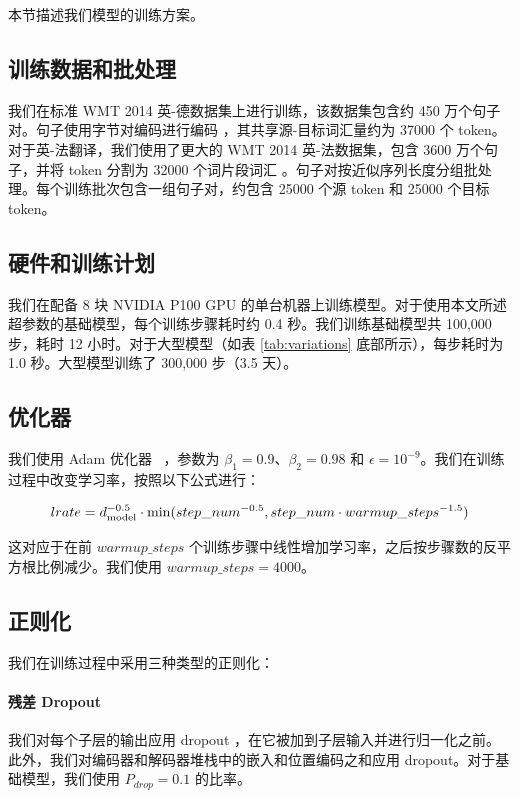 本节描述我们模型的训练方案。 


\subsection{训练数据和批处理}
我们在标准 WMT 2014 英-德数据集上进行训练，该数据集包含约 450 万个句子对。句子使用字节对编码进行编码 \citep{DBLP:journals/corr/BritzGLL17}，其共享源-目标词汇量约为 37000 个 token。对于英-法翻译，我们使用了更大的 WMT 2014 英-法数据集，包含 3600 万个句子，并将 token 分割为 32000 个词片段词汇 \citep{wu2016google}。句子对按近似序列长度分组批处理。每个训练批次包含一组句子对，约包含 25000 个源 token 和 25000 个目标 token。  

\subsection{硬件和训练计划}

我们在配备 8 块 NVIDIA P100 GPU 的单台机器上训练模型。对于使用本文所述超参数的基础模型，每个训练步骤耗时约 0.4 秒。我们训练基础模型共 100,000 步，耗时 12 小时。对于大型模型（如表 \ref{tab:variations} 底部所示），每步耗时为 1.0 秒。大型模型训练了 300,000 步（3.5 天）。

\subsection{优化器} 我们使用 Adam 优化器 ~\citep{kingma2014adam}，参数为 $\beta_1=0.9$、$\beta_2=0.98$ 和 $\epsilon=10^{-9}$。我们在训练过程中改变学习率，按照以下公式进行：

\begin{equation}
lrate = d_{\text{model}}^{-0.5} \cdot
  \min({step\_num}^{-0.5},
    {step\_num} \cdot {warmup\_steps}^{-1.5})
\end{equation}

这对应于在前 $warmup\_steps$ 个训练步骤中线性增加学习率，之后按步骤数的反平方根比例减少。我们使用 $warmup\_steps=4000$。

\subsection{正则化} \label{sec:reg}

我们在训练过程中采用三种类型的正则化： 
\paragraph{残差 Dropout} 我们对每个子层的输出应用 dropout \citep{srivastava2014dropout}，在它被加到子层输入并进行归一化之前。此外，我们对编码器和解码器堆栈中的嵌入和位置编码之和应用 dropout。对于基础模型，我们使用 $P_{drop}=0.1$ 的比率。

